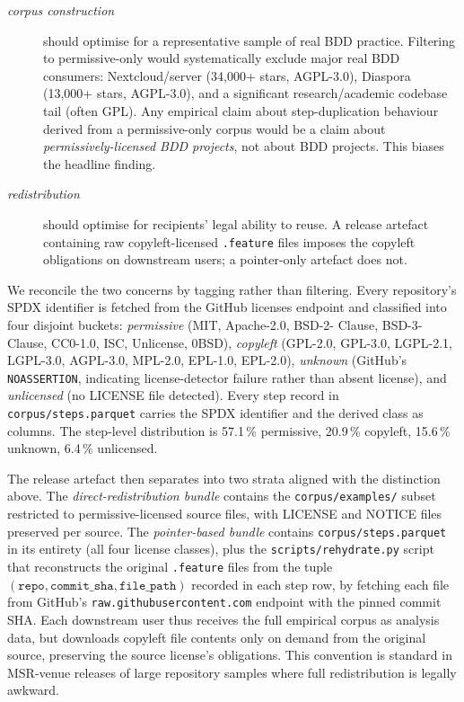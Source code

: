 \documentclass[11pt,a4paper]{article}
\begin{document}
\begin{description}
\item[\emph{corpus construction}] should optimise for a
representative sample of real BDD practice. Filtering to
permissive-only would systematically exclude major real BDD
consumers: Nextcloud/server (34{,}000+ stars, AGPL-3.0),
Diaspora (13{,}000+ stars, AGPL-3.0), and a significant
research/academic codebase tail (often GPL). Any empirical claim
about step-duplication behaviour derived from a permissive-only
corpus would be a claim about \emph{permissively-licensed BDD
projects}, not about BDD projects. This biases the headline
finding.

\item[\emph{redistribution}] should optimise for recipients'
legal ability to reuse. A release artefact containing raw
copyleft-licensed \texttt{.feature} files imposes the copyleft
obligations on downstream users; a pointer-only artefact does
not.
\end{description}

We reconcile the two concerns by tagging rather than filtering.
Every repository's SPDX identifier is fetched from the GitHub
licenses endpoint \citep{github2024licenses} and classified into
four disjoint buckets: \emph{permissive} (MIT, Apache-2.0, BSD-2-
Clause, BSD-3-Clause, CC0-1.0, ISC, Unlicense, 0BSD),
\emph{copyleft} (GPL-2.0, GPL-3.0, LGPL-2.1, LGPL-3.0, AGPL-3.0,
MPL-2.0, EPL-1.0, EPL-2.0), \emph{unknown} (GitHub's
\texttt{NOASSERTION}, indicating license-detector failure rather
than absent license), and \emph{unlicensed} (no LICENSE file
detected). Every step record in \texttt{corpus/steps.parquet}
carries the SPDX identifier and the derived class as columns.
The step-level distribution is 57.1\,\% permissive, 20.9\,\%
copyleft, 15.6\,\% unknown, 6.4\,\% unlicensed.

The release artefact then separates into two strata aligned with
the distinction above. The \emph{direct-redistribution bundle}
contains the \texttt{corpus/examples/} subset restricted to
permissive-licensed source files, with LICENSE and NOTICE files
preserved per source. The \emph{pointer-based bundle} contains
\texttt{corpus/steps.parquet} in its entirety (all four license
classes), plus the \texttt{scripts/rehydrate.py} script that
reconstructs the original \texttt{.feature} files from the
tuple \((\texttt{repo}, \texttt{commit\_sha}, \texttt{file\_path})\)
recorded in each step row, by fetching each file from
GitHub's \texttt{raw.githubusercontent.com} endpoint with the
pinned commit SHA. Each downstream user thus receives the full empirical corpus as
analysis data, but downloads copyleft file contents only on
demand from the original source, preserving the source license's
obligations. This convention is standard in MSR-venue releases
of large repository samples where full redistribution is legally
awkward.
\end{document}
